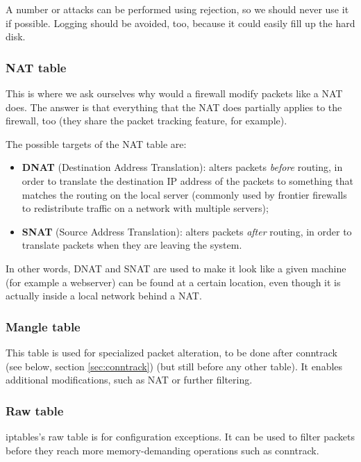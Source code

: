 A number or attacks can be performed using rejection, so we should never use it if possible. Logging should be avoided, too, because it could easily fill up the hard disk.


\subsubsection{NAT table}
This is where we ask ourselves why would a firewall modify packets like a NAT does. The answer is that everything that the NAT does partially applies to the firewall, too (they share the packet tracking feature, for example).

The possible targets of the NAT table are:

\begin{itemize}
    \item \textbf{DNAT} (Destination Address Translation): alters packets \textit{before} routing, in order to translate the destination IP address of the packets to something that matches the routing on the local server (commonly used by frontier firewalls to redistribute traffic on a network with multiple servers);
    \item \textbf{SNAT} (Source Address Translation): alters packets \textit{after} routing, in order  to translate packets when they are leaving the system.
\end{itemize}

In other words, DNAT and SNAT are used to make it look like a given machine (for example a webserver) can be found at a certain location, even though it is actually inside a local network behind a NAT.


\subsubsection{Mangle table}
This table is used for specialized packet alteration, to be done after conntrack (see below, section \ref{sec:conntrack}) (but still before any other table). It enables additional modifications, such as NAT or further filtering.


\subsubsection{Raw table}
iptables’s raw table is for configuration exceptions. It can be used to filter packets before they reach more memory-demanding operations such as conntrack.

